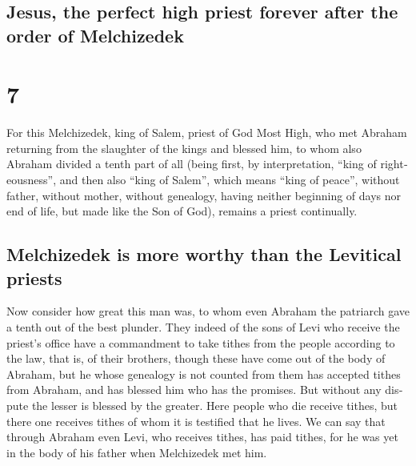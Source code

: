 \begin{paracol}{2}
\switchcolumn
\begin{otherlanguage}{english}

\hypertarget{jesus-the-perfect-high-priest-forever-after-the-order-of-melchizedek}{%
\subsection{Jesus, the perfect high priest forever after the order of
Melchizedek}\label{jesus-the-perfect-high-priest-forever-after-the-order-of-melchizedek}}

\hypertarget{section-13}{%
\section{7}\label{section-13}}

 For this Melchizedek, king of Salem, priest of God Most
High, who met Abraham returning from the slaughter of the kings and
blessed him,  to whom also Abraham divided a tenth part of
all (being first, by interpretation, ``king of righteousness'', and then
also ``king of Salem'', which means ``king of peace'', 
without father, without mother, without genealogy, having neither
beginning of days nor end of life, but made like the Son of God),
remains a priest continually.

\hypertarget{melchizedek-is-more-worthy-than-the-levitical-priests}{%
\subsection{Melchizedek is more worthy than the Levitical
priests}\label{melchizedek-is-more-worthy-than-the-levitical-priests}}

 Now consider how great this man was, to whom even Abraham
the patriarch gave a tenth out of the best plunder.  They
indeed of the sons of Levi who receive the priest's office have a
commandment to take tithes from the people according to the law, that
is, of their brothers, though these have come out of the body of
Abraham,  but he whose genealogy is not counted from them
has accepted tithes from Abraham, and has blessed him who has the
promises.  But without any dispute the lesser is blessed
by the greater.  Here people who die receive tithes, but
there one receives tithes of whom it is testified that he lives.
 We can say that through Abraham even Levi, who receives
tithes, has paid tithes,  for he was yet in the body of
his father when Melchizedek met him.


\end{otherlanguage}
\end{paracol}
